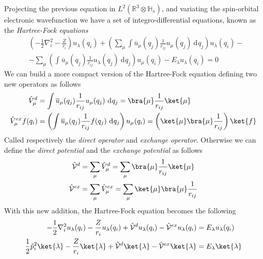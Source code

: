 \documentclass[a4paper, 11pt]{book}
\newcommand{\1}{\opr{\mathds{1}}}
\newcommand{\diff}[2][]{\ \mathrm{d}^{#1}#2}
\newcommand{\opr}[1]{\hat{#1}}
\newcommand{\cc}[1]{\overline{#1}}
\newcommand{\hilbert}{\mathbb{H}}
\theoremstyle{plain}
\begin{document}
	Projecting the previous equation in $L^2(\mathbb{R}^3\otimes\hilbert_s)$, and variating the spin-orbital electronic wavefunction we have a set of integro-differential equations, known as the \textit{Hartree-Fock equations}
	\begin{equation}
		\begin{aligned}
			&\left( -\frac{1}{2}\nabla_i^2-\frac{Z}{r_i} \right)u_{\lambda}(q_i)+\left( \sum_{\mu}\int \cc{u}_{\mu}(q_j)\frac{1}{r_{ij}}u_{\mu}(q_j)\diff{q_j} \right)u_{\lambda}(q_i)-\\
			&-\sum_{\mu}\left( \int \cc{u}_{\mu}(q_j)\frac{1}{r_{ij}}u_{\lambda}(q_j)\diff{q_j} \right)u_{\mu}(q_i)-E_{\lambda}u_{\lambda}(q_i)=0
		\end{aligned}
		\label{eq:hartreefockequation}
	\end{equation}
	We can build a more compact version of the Hartree-Fock equation defining two new operators as follows
	\begin{equation}
		\begin{aligned}
			\opr{V}^d_{\mu}&=\int\cc{u}_{\mu}(q_j)\frac{1}{r_{ij}}u_{\mu}(q_j)\diff{q_j}=\bra{\mu}\frac{1}{r_{ij}}\ket{\mu}\\
			\opr{V}^{ex}_{\mu}f(q_i)&=\left(\int\cc{u}_{\mu}(q_j)\frac{1}{r_{ij}}f(q_j)\diff{q_j}\right)u_{\mu}(q_i)=\left( \ket{\mu}\bra{\mu}\frac{1}{r_{ij}} \right)\ket{f}\\
		\end{aligned}
		\label{eq:exchangedirectoperatorhf}
	\end{equation}
	Called respectively the \textit{direct operator} and \textit{exchange operator}. Otherwise we can define the \textit{direct potential} and the \textit{exchange potential} as follows
	\begin{equation}
		\begin{aligned}
			\opr{\mathcal{V}}^d&=\sum_{\mu}\opr{V}^d_{\mu}=\sum_{\mu}\bra{\mu}\frac{1}{r_{ij}}\ket{\mu}\\
			\opr{\mathcal{V}}^{ex}&=\sum_{\mu}\opr{V}^{ex}_{\mu}=\sum_{\mu}\ket{\mu}\bra{\mu}\frac{1}{r_{ij}}
		\end{aligned}
		\label{eq:exchangedirectpotentialhf}
	\end{equation}
	With this new addition, the Hartree-Fock equation becomes the following
	\begin{equation}
		\begin{aligned}
			-\frac{1}{2}\nabla_i^2u_{\lambda}(q_i)-\frac{Z}{r_i}u_{\lambda}(q_i)+\opr{\mathcal{V}}^du_{\lambda}(q_i)-\opr{\mathcal{V}}^{ex}u_{\lambda}(q_i)&=E_{\lambda}u_{\lambda}(q_i)\\
			\frac{1}{2}\opr{p}_i^2\ket{\lambda}-\frac{Z}{r_i}\ket{\lambda}+\opr{\mathcal{V}}^d\ket{\lambda}-\opr{\mathcal{V}}^{ex}\ket{\lambda}&=E_{\lambda}\ket{\lambda}
		\end{aligned}
		\label{eq:hartreefockeqpotentials}
	\end{equation}
\end{document}
